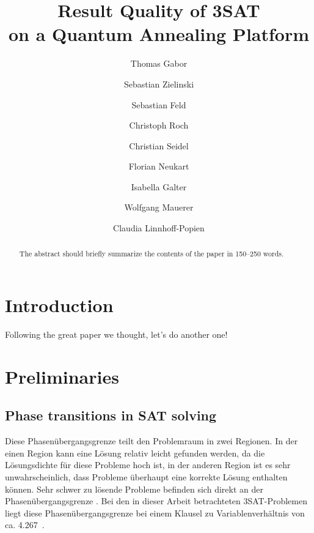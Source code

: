 \documentclass[runningheads]{llncs}
\begin{document}
%
\title{Result Quality of 3SAT\\on a Quantum Annealing Platform}
%
%
\author{Thomas Gabor \and
Sebastian Zielinski \and
Sebastian Feld \and
Christoph Roch \and
Christian Seidel \and
Florian Neukart \and
Isabella Galter \and
Wolfgang Mauerer \and
Claudia Linnhoff-Popien}
%
%
%
\maketitle              %
%
\begin{abstract}
The abstract should briefly summarize the contents of the paper in
150--250 words.

\end{abstract}
%
%
%
\section{Introduction}
Following the great paper \cite{feld2018hybrid} we thought, let's do another one!

\section{Preliminaries}
\subsection{Phase transitions in SAT solving}
Diese Phasenübergangsgrenze teilt den Problemraum in zwei Regionen. In der einen Region kann eine Lösung relativ leicht gefunden werden, da die Lösungsdichte für diese Probleme hoch ist, in der anderen Region ist es sehr unwahrscheinlich, dass Probleme überhaupt eine korrekte Lösung enthalten können. Sehr schwer zu lösende Probleme befinden sich direkt an der Phasenübergangsgrenze \cite{cheeseman1991really}. Bei den in dieser Arbeit betrachteten 3SAT-Problemen liegt diese Phasenübergangsgrenze bei einem Klausel zu Variablenverhältnis von ca. 4.267~\cite{mezard2002random}.
\end{document}
